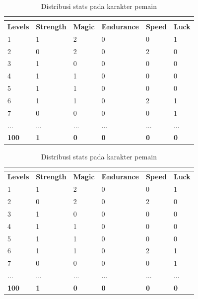 \begin{longtable}{|l|l|l|l|l|l|}
	\caption{Distribusi stats pada karakter pemain}
	\vspace{1ex}
	\label{tb:player_hp_mp_2}\\
	\hline
	\rowcolor[HTML]{C0C0C0} 
	\textbf{Levels} & \textbf{Strength} & \textbf{Magic} & \textbf{Endurance} & \textbf{Speed} & \textbf{Luck} \\ \hline
	1 & 1 & 2 & 0 & 0 & 1 \\ \hline
	2 & 0 & 2 & 0 & 2 & 0 \\ \hline
	3 & 1 & 0 & 0 & 0 & 0 \\ \hline
	4 & 1 & 1 & 0 & 0 & 0 \\ \hline
	5 & 1 & 1 & 0 & 0 & 0 \\ \hline
	6 & 1 & 1 & 0 & 2 & 1 \\ \hline
	7 & 0 & 0 & 0 & 0 & 1 \\ \hline
	... & ... & ... & ... & ... & ... \\ \hline
	\textbf{100} & \textbf{1} & \textbf{0} & \textbf{0} & \textbf{0} & \textbf{0} \\ \hline
\end{longtable}
\vspace{-1ex}

\begin{longtable}{|l|l|l|l|l|l|}
	\caption{Distribusi stats pada karakter pemain}
	\vspace{1ex}
	\label{tb:player_hp_mp_3}\\
	\hline
	\rowcolor[HTML]{C0C0C0} 
	\textbf{Levels} & \textbf{Strength} & \textbf{Magic} & \textbf{Endurance} & \textbf{Speed} & \textbf{Luck} \\ \hline
	1 & 1 & 2 & 0 & 0 & 1 \\ \hline
	2 & 0 & 2 & 0 & 2 & 0 \\ \hline
	3 & 1 & 0 & 0 & 0 & 0 \\ \hline
	4 & 1 & 1 & 0 & 0 & 0 \\ \hline
	5 & 1 & 1 & 0 & 0 & 0 \\ \hline
	6 & 1 & 1 & 0 & 2 & 1 \\ \hline
	7 & 0 & 0 & 0 & 0 & 1 \\ \hline
	... & ... & ... & ... & ... & ... \\ \hline
	\textbf{100} & \textbf{1} & \textbf{0} & \textbf{0} & \textbf{0} & \textbf{0} \\ \hline
\end{longtable}
\vspace{-1ex}

